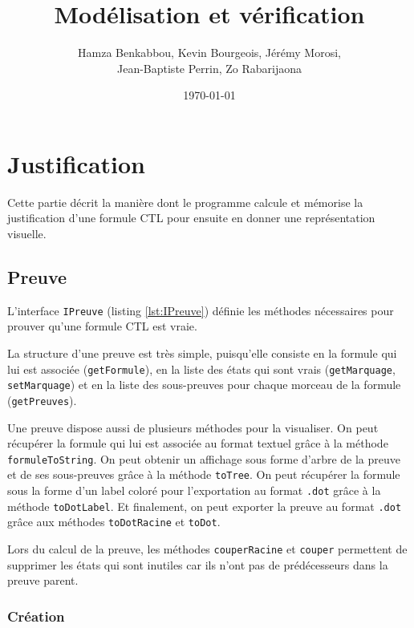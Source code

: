 \documentclass[dvipsnames]{report}
\begin{document}
\title{Modélisation et vérification}   %
\author{Hamza Benkabbou, Kevin Bourgeois, Jérémy Morosi,\\Jean-Baptiste Perrin, Zo Rabarijaona}         %
\date{\today}    %
\maketitle

\newpage

\section{Justification}

Cette partie décrit la manière dont le programme calcule et mémorise la justification d'une formule CTL pour ensuite en donner une représentation visuelle.

\subsection{Preuve}

L'interface \texttt{IPreuve} (listing \ref{lst:IPreuve}) définie les méthodes nécessaires pour prouver qu'une formule CTL est vraie. 

La structure d'une preuve est très simple, puisqu'elle consiste en la formule qui lui est associée (\texttt{getFormule}), en la liste des états qui sont vrais (\texttt{getMarquage}, \texttt{setMarquage}) et en la liste des sous-preuves pour chaque morceau de la formule (\texttt{getPreuves}).

Une preuve dispose aussi de plusieurs méthodes pour la visualiser. On peut récupérer la formule qui lui est associée au format textuel grâce à la méthode \texttt{formuleToString}. On peut obtenir un affichage sous forme d'arbre de la preuve et de ses sous-preuves grâce à la méthode \texttt{toTree}. On peut récupérer la formule sous la forme d'un label coloré pour l'exportation au format \texttt{.dot} grâce à la méthode \texttt{toDotLabel}. Et finalement, on peut exporter la preuve au format \texttt{.dot} grâce aux méthodes \texttt{toDotRacine} et \texttt{toDot}.

Lors du calcul de la preuve, les méthodes \texttt{couperRacine} et \texttt{couper} permettent de supprimer les états qui sont inutiles car ils n'ont pas de prédécesseurs dans la preuve parent.

\subsubsection{Création}
\end{document}
